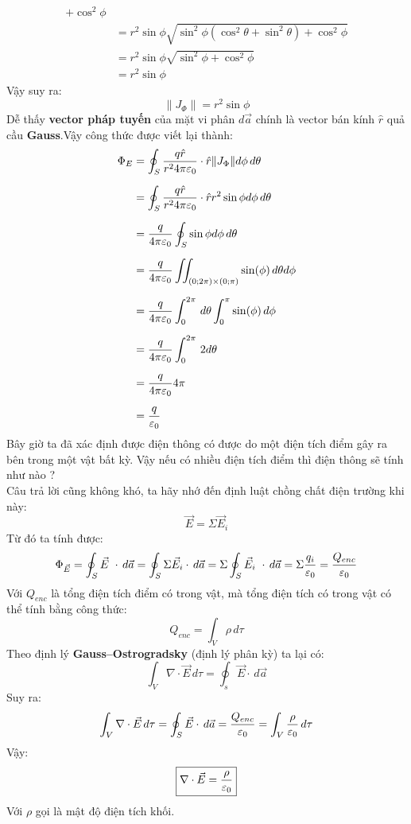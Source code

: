 \begin{enumerate}
\begin{align*}
{+
\cos^2\phi
} \\[8pt]
&=
r^2 \sin\phi
\sqrt{
\sin^2\phi(\cos^2\theta+\sin^2\theta)
+
\cos^2\phi
} \\[8pt]
&=
r^2 \sin\phi
\sqrt{\sin^2\phi+\cos^2\phi} \\[8pt]
&=
r^2 \sin\phi
\end{align*}
Vậy suy ra:
\[
\|J_\Phi\|
=
r^2\sin\phi
\]
Dễ thấy \textbf{vector pháp tuyến} của mặt vi phân $d\vec{a}$ chính là vector bán kính $\hat{r}$ quả cầu \textbf{Gauss}.Vậy công thức được viết lại thành:
\begin{align*}
\Phi_E &= \oint_{S} \frac{q \hat{r}}{r^2 4\pi \varepsilon_{0}}\cdot \hat{r} \lVert J_\Phi \rVert d\phi\,d\theta\\[6pt]
       &= \oint_{S} \frac{q \hat{r}}{r^2 4\pi \varepsilon_{0}}\cdot \hat{r} r^2\sin\phi d\phi\,d\theta\\[6pt]
       &= \frac{q}{4\pi \varepsilon_{0}} \oint_{S} \sin\phi d\phi\,d\theta\\[6pt]
       &= \frac{q}{4\pi \varepsilon_{0}} \iint_{(0;2\pi)\times(0;\pi)} \sin(\phi)\, d\theta d\phi \\[6pt]
       &= \frac{q}{4\pi \varepsilon_{0}} \int_{0}^{2\pi}\, d\theta \int_{0}^{\pi} \sin(\phi)\, d\phi \\[6pt]
       &= \frac{q}{4\pi \varepsilon_{0}} \int_{0}^{2\pi}\, 2d\theta \\[6pt]
       &= \frac{q}{4\pi \varepsilon_{0}} 4\pi \\[6pt]
       &= \frac{q}{\varepsilon_{0}}
\end{align*}
Bây giờ ta đã xác định được điện thông có được do một điện tích điểm gây ra bên trong một vật bất kỳ. Vậy nếu có nhiều điện tích điểm thì điện thông sẽ tính như nào ?\\[6pt]
Câu trả lời cũng không khó, ta hãy nhớ đến định luật chồng chất điện trường khi này:
\[
\vec{E}=\Sigma{\vec{E}_{i}}
\]
Từ đó ta tính được:
\[
\Phi_{\vec{E}} = \oint_{S} \vec{E}\ \cdot \, d\vec{a}=\oint_{S} \Sigma{\vec{E}_{i}} \cdot \, d\vec{a}=\Sigma \oint_{S} \vec{E}_{i}\ \cdot \, d\vec{a}=\Sigma \frac{q_{i}}{\varepsilon_{0}}=\frac{Q_{enc}}{\varepsilon_{0}}
\]
Với $Q_{enc}$ là tổng điện tích điểm có trong vật, mà tổng điện tích có trong vật có thể tính bằng công thức:
\[
Q_{enc} = \int_{V} \rho\, d\tau
\]
Theo định lý \textbf{Gauss--Ostrogradsky} (định lý phân kỳ) ta lại có:
\[
\int_{V} \nabla \cdot \vec{E} \, d\tau = \oint_{s} \vec{E} \cdot\, d\vec{a}
\]
Suy ra:
\[
\int_{V} \nabla \cdot \vec{E} \, d\tau = \oint_{S} \vec{E} \cdot\, d\vec{a} = \frac{Q_{enc}}{\varepsilon_{0}}= \int_{V} \frac{\rho}{\varepsilon_0} \, d\tau
\]
Vậy:
\[
\boxed{\nabla \cdot \vec{E} =\frac{\rho}{\varepsilon_{0}}}
\]
Với $\rho$ gọi là mật độ điện tích khối.


\end{enumerate}
